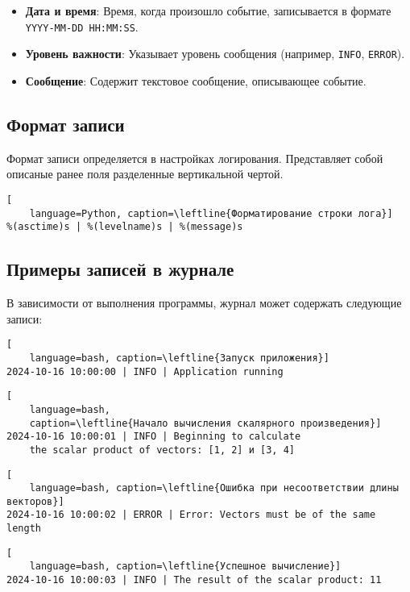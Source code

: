 \begin{itemize}
    \item \textbf{Дата и время}:
		Время, когда произошло событие,
		записывается в формате \texttt{YYYY-MM-DD HH:MM:SS}.
    \item \textbf{Уровень важности}:
		Указывает уровень сообщения (например, \texttt{INFO}, \texttt{ERROR}).
    \item \textbf{Сообщение}:
		Содержит текстовое сообщение, описывающее событие.
\end{itemize}

\subsection{Формат записи}

Формат записи определяется в настройках логирования.
Представляет собой описаные ранее поля разделенные вертикальной чертой.

\begin{lstlisting}[
	language=Python, caption=\leftline{Форматирование строки лога}]
%(asctime)s | %(levelname)s | %(message)s
\end{lstlisting}

\subsection{Примеры записей в журнале}

В зависимости от выполнения программы, журнал может содержать следующие записи:

\begin{lstlisting}[
	language=bash, caption=\leftline{Запуск приложения}]
2024-10-16 10:00:00 | INFO | Application running
\end{lstlisting}

\begin{lstlisting}[
	language=bash,
	caption=\leftline{Начало вычисления скалярного произведения}]
2024-10-16 10:00:01 | INFO | Beginning to calculate
	the scalar product of vectors: [1, 2] и [3, 4]
\end{lstlisting}

\begin{lstlisting}[
	language=bash, caption=\leftline{Ошибка при несоответствии длины векторов}]
2024-10-16 10:00:02 | ERROR | Error: Vectors must be of the same length
\end{lstlisting}

\begin{lstlisting}[
	language=bash, caption=\leftline{Успешное вычисление}]
2024-10-16 10:00:03 | INFO | The result of the scalar product: 11
\end{lstlisting}

